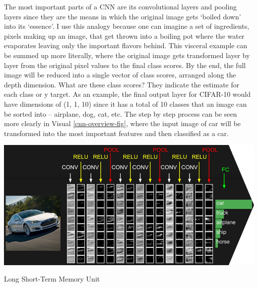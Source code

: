 \documentclass[12pt]{article}
\begin{document}
                The most important parts of a CNN are its convolutional layers and pooling layers 
                since they are the means in which the original image gets ‘boiled down’ into its ‘essence’.
                I use this analogy because one can imagine a set of ingredients, pixels making up an image, 
                that get thrown into a boiling pot where the water evaporates leaving only the important flavors behind. 
                This visceral example can be summed up more literally, 
                where the original image gets transformed layer by layer from the original pixel values to the final class scores. 
                By the end, the full image will be reduced into a single vector of class scores, arranged along the depth dimension. 
                What are these class scores? They indicate the estimate for each class or y target. 
                As an example, the final output layer for CIFAR-10 would have dimensions of (1, 1, 10) 
                since it has a total of 10 classes that an image can be sorted into \cite{cs231n2023} -- airplane, dog, cat, etc.
                The step by step process can be seen more clearly in Visual \ref{cnn-overview-fig},
                where the input image of car will be transformed into the most important features and then classified as a car.

                \begin{table}[h]
            
                    \begin{center}
    
                        \includegraphics[scale=0.65]{cnn-overview.png}
                        \caption{Long Short-Term Memory Unit \cite{cs231n2023}}
                        \label{cnn-overview-fig}
            
                    \end{center}
                    
                \end{table}
    
\end{document}

